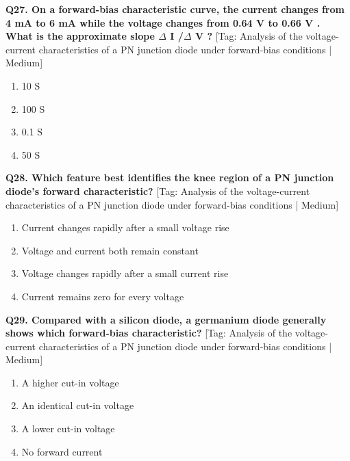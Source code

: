 \noindent\textbf{Q27. On a forward-bias characteristic curve, the current changes from 4 mA to 6 mA while the voltage changes from 0.64 V to 0.66 V . What is the approximate slope $\Delta$ I /$\Delta$ V ?} \hfill [Tag: Analysis of the voltage-current characteristics of a PN junction diode under forward-bias conditions | Medium]
\begin{enumerate}[label=(\alph*),topsep=2pt,itemsep=1pt,partopsep=0pt,parsep=0pt]
    \item {10 S}
    \item {100 S}
    \item {0.1 S}
    \item {50 S}
\end{enumerate}
\vspace{2mm}

\noindent\textbf{Q28. Which feature best identifies the knee region of a PN junction diode's forward characteristic?} \hfill [Tag: Analysis of the voltage-current characteristics of a PN junction diode under forward-bias conditions | Medium]
\begin{enumerate}[label=(\alph*),topsep=2pt,itemsep=1pt,partopsep=0pt,parsep=0pt]
    \item {Current changes rapidly after a small voltage rise}
    \item {Voltage and current both remain constant}
    \item {Voltage changes rapidly after a small current rise}
    \item {Current remains zero for every voltage}
\end{enumerate}
\vspace{2mm}

\noindent\textbf{Q29. Compared with a silicon diode, a germanium diode generally shows which forward-bias characteristic?} \hfill [Tag: Analysis of the voltage-current characteristics of a PN junction diode under forward-bias conditions | Medium]
\begin{enumerate}[label=(\alph*),topsep=2pt,itemsep=1pt,partopsep=0pt,parsep=0pt]
    \item {A higher cut-in voltage}
    \item {An identical cut-in voltage}
    \item {A lower cut-in voltage}
    \item {No forward current}
\end{enumerate}
\vspace{2mm}

